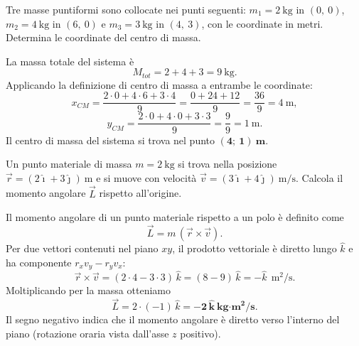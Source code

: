 \begin{question}[ID=1.5, subtitle={Centro di massa di tre masse puntiformi in posizioni generali}, tags={corpo rigido, centro di massa}, difficulty=facile]
Tre masse puntiformi sono collocate nei punti seguenti: $m_1 = 2\ \text{kg}$ in $(0,\ 0)$, $m_2 = 4\ \text{kg}$ in $(6,\ 0)$ e $m_3 = 3\ \text{kg}$ in $(4,\ 3)$, con le coordinate in metri. Determina le coordinate del centro di massa.
\begin{solution}
La massa totale del sistema è
\[
M_{tot} = 2 + 4 + 3 = 9\ \text{kg}.
\]
Applicando la definizione di centro di massa a entrambe le coordinate:
\[
x_{CM} = \frac{2\cdot 0 + 4\cdot 6 + 3\cdot 4}{9} = \frac{0 + 24 + 12}{9} = \frac{36}{9} = 4\ \text{m},
\]
\[
y_{CM} = \frac{2\cdot 0 + 4\cdot 0 + 3\cdot 3}{9} = \frac{9}{9} = 1\ \text{m}.
\]
Il centro di massa del sistema si trova nel punto $\mathbf{(4;\ 1)\ \text{m}}$.
\end{solution}
\end{question}


\begin{question}[ID=2.1, subtitle={Momento angolare di un corpo in moto}, tags={corpo rigido, momento angolare}, difficulty=media]
Un punto materiale di massa $m = 2\ \text{kg}$ si trova nella posizione $\vec{r} = (2\hat{\imath} + 3\hat{\jmath})\ \text{m}$ e si muove con velocità $\vec{v} = (3\hat{\imath} + 4\hat{\jmath})\ \text{m/s}$. Calcola il momento angolare $\vec{L}$ rispetto all'origine.
\begin{solution}
Il momento angolare di un punto materiale rispetto a un polo è definito come
\[
\vec{L} = m\,(\vec{r} \times \vec{v}).
\]
Per due vettori contenuti nel piano $xy$, il prodotto vettoriale è diretto lungo $\hat{k}$ e ha componente $r_x v_y - r_y v_x$:
\[
\vec{r} \times \vec{v} = (2\cdot 4 - 3\cdot 3)\,\hat{k} = (8 - 9)\,\hat{k} = -\hat{k}\ \ \text{m}^2/\text{s}.
\]
Moltiplicando per la massa otteniamo
\[
\vec{L} = 2\cdot(-1)\,\hat{k} = \mathbf{-2\,\hat{k}\ \text{kg·m}^2/\text{s}}.
\]
Il segno negativo indica che il momento angolare è diretto verso l'interno del piano (rotazione oraria vista dall'asse $z$ positivo).
\end{solution}
\end{question}


